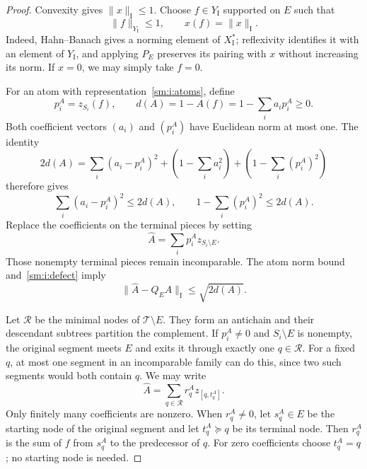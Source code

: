 \begin{proof}
Convexity gives $\|x\|_{\mathrm I}\leq1$.
Choose $f\in Y_{\mathrm I}$ supported on $E$ such that
\[
 \|f\|_{Y_{\mathrm I}}\leq1,
 \qquad x(f)=\|x\|_{\mathrm I}.
\]
Indeed, Hahn--Banach gives a norming element of $X_{\mathrm I}^*$;
reflexivity identifies it with an element of $Y_{\mathrm I}$, and
applying $P_E$ preserves its pairing with $x$ without increasing its
norm.  If $x=0$, we may simply take $f=0$.

For an atom with representation~\eqref{sm:i:atoms}, define
\[
 p_i^A=z_{S_i}(f),\qquad
 d(A)=1-A(f)=1-\sum_i a_i p_i^A\geq0.
\]
Both coefficient vectors $(a_i)$ and $(p_i^A)$ have Euclidean norm at
most one.  The identity
\[
 2d(A)=\sum_i(a_i-p_i^A)^2
       +\left(1-\sum_i a_i^2\right)
       +\left(1-\sum_i(p_i^A)^2\right)
\]
therefore gives
\begin{equation}
 \sum_i(a_i-p_i^A)^2\leq2d(A),
 \qquad 1-\sum_i(p_i^A)^2\leq2d(A).
 \label{sm:i:defect}
\end{equation}
Replace the coefficients on the terminal pieces by setting
\[
 \widehat A=\sum_i p_i^A z_{S_i\setminus E}.
\]
Those nonempty terminal pieces remain incomparable.  The atom norm
bound and~\eqref{sm:i:defect} imply
\begin{equation}
 \|\widehat A-Q_EA\|_{\mathrm I}\leq\sqrt{2d(A)}.
 \label{sm:i:replacement}
\end{equation}

Let $\mathcal R$ be the minimal nodes of $\mathcal T\setminus E$.
They form an antichain and their descendant subtrees partition the
complement.  If $p_i^A\ne0$ and $S_i\setminus E$ is nonempty, the original segment
meets $E$ and exits it through exactly one $q\in\mathcal R$.
For a fixed $q$, at most one segment in an incomparable family can do
this, since two such segments would both contain $q$.  We may write
\begin{equation}
 \widehat A=\sum_{q\in\mathcal R}r_q^A z_{[q,t_q^A]}.
 \label{sm:i:exits}
\end{equation}
Only finitely many coefficients are nonzero.  When $r_q^A\ne0$, let
$s_q^A\in E$ be the starting node of the original segment and let
$t_q^A\succeq q$ be its terminal node.  Then $r_q^A$ is the sum of $f$
from $s_q^A$ to the predecessor of $q$.  For zero coefficients choose
$t_q^A=q$; no starting node is needed.


\end{proof}
